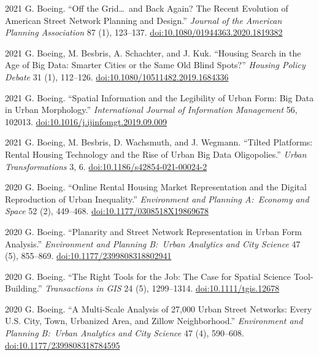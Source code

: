 \documentclass[11pt,letterpaper]{report} %
\begin{document}
\begin{tablist}
        \item[2021] \tab{}G. Boeing. \enquote{Off the Grid\ldots\ and Back Again? The Recent Evolution of American Street Network Planning and Design.} \textit{Journal of the American Planning Association} 87 (1), 123--137. \href{https://doi.org/10.1080/01944363.2020.1819382}{doi:10.1080/01944363.2020.1819382}

        \item[2021] \tab{}G. Boeing, M. Besbris, A. Schachter, and J. Kuk. \enquote{Housing Search in the Age of Big Data: Smarter Cities or the Same Old Blind Spots?} \textit{Housing Policy Debate} 31 (1), 112--126. \href{https://doi.org/10.1080/10511482.2019.1684336}{doi:10.1080/10511482.2019.1684336}

        \item[2021] \tab{}G. Boeing. \enquote{Spatial Information and the Legibility of Urban Form: Big Data in Urban Morphology.} \textit{International Journal of Information Management} 56, 102013. \href{https://doi.org/10.1016/j.ijinfomgt.2019.09.009}{doi:10.1016/j.ijinfomgt.2019.09.009}

        \item[2021] \tab{}G. Boeing, M. Besbris, D. Wachsmuth, and J. Wegmann. \enquote{Tilted Platforms: Rental Housing Technology and the Rise of Urban Big Data Oligopolies.} \textit{Urban Transformations} 3, 6. \href{https://doi.org/10.1186/s42854-021-00024-2}{doi:10.1186/s42854-021-00024-2}

        \item[2020] \tab{}G. Boeing. \enquote{Online Rental Housing Market Representation and the Digital Reproduction of Urban Inequality.} \textit{Environment and Planning A:\ Economy and Space} 52 (2), 449--468. \href{https://doi.org/10.1177/0308518X19869678}{doi:10.1177/0308518X19869678}

        \item[2020] \tab{}G. Boeing. \enquote{Planarity and Street Network Representation in Urban Form Analysis.} \textit{Environment and Planning B:\ Urban Analytics and City Science} 47 (5), 855--869. \href{https://doi.org/10.1177/2399808318802941}{doi:10.1177/2399808318802941}

        \item[2020] \tab{}G. Boeing. \enquote{The Right Tools for the Job: The Case for Spatial Science Tool-Building.} \textit{Transactions in GIS} 24 (5), 1299--1314. \href{https://doi.org/10.1111/tgis.12678}{doi:10.1111/tgis.12678}

        \item[2020] \tab{}G. Boeing. \enquote{A Multi-Scale Analysis of 27,000 Urban Street Networks: Every U.S. City, Town, Urbanized Area, and Zillow Neighborhood.} \textit{Environment and Planning B:\ Urban Analytics and City Science} 47 (4), 590--608. \href{https://doi.org/10.1177/2399808318784595}{doi:10.1177/2399808318784595}


\end{tablist}
\end{document}
